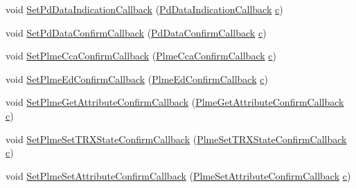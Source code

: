 \begin{DoxyCompactItemize}
\item 
void \hyperlink{classns3_1_1LrWpanPhy_ac008f1b80cac86551aec289676251fa9}{Set\+Pd\+Data\+Indication\+Callback} (\hyperlink{group__lr-wpan_ga5942bd2136b995f9104db9cfc311ace3}{Pd\+Data\+Indication\+Callback} \hyperlink{mmwave_2model_2fading-traces_2fading__trace__generator_8m_ae0323a9039add2978bf5b49550572c7c}{c})
\item 
void \hyperlink{classns3_1_1LrWpanPhy_a04dd58cdf79c6769510d5ea57d8b7326}{Set\+Pd\+Data\+Confirm\+Callback} (\hyperlink{group__lr-wpan_ga0cba923353248fc2a8dc81303c6d5e35}{Pd\+Data\+Confirm\+Callback} \hyperlink{mmwave_2model_2fading-traces_2fading__trace__generator_8m_ae0323a9039add2978bf5b49550572c7c}{c})
\item 
void \hyperlink{classns3_1_1LrWpanPhy_af6bf7c705891030e91c0574a26bc4a0e}{Set\+Plme\+Cca\+Confirm\+Callback} (\hyperlink{group__lr-wpan_gafd859f54b5982ab4c85838a40b1c7340}{Plme\+Cca\+Confirm\+Callback} \hyperlink{mmwave_2model_2fading-traces_2fading__trace__generator_8m_ae0323a9039add2978bf5b49550572c7c}{c})
\item 
void \hyperlink{classns3_1_1LrWpanPhy_a34c4ceaf91ccb56d17dcd92bc392df83}{Set\+Plme\+Ed\+Confirm\+Callback} (\hyperlink{group__lr-wpan_gadecf12d559c4db545036668cf9a384b6}{Plme\+Ed\+Confirm\+Callback} \hyperlink{mmwave_2model_2fading-traces_2fading__trace__generator_8m_ae0323a9039add2978bf5b49550572c7c}{c})
\item 
void \hyperlink{classns3_1_1LrWpanPhy_a17d17169a7e9a9571bc904aae7cf0391}{Set\+Plme\+Get\+Attribute\+Confirm\+Callback} (\hyperlink{group__lr-wpan_ga024ef2b58b799155fc114f3d895ca283}{Plme\+Get\+Attribute\+Confirm\+Callback} \hyperlink{mmwave_2model_2fading-traces_2fading__trace__generator_8m_ae0323a9039add2978bf5b49550572c7c}{c})
\item 
void \hyperlink{classns3_1_1LrWpanPhy_a1f251e13ef1dfd58b5261f9e214f0a8f}{Set\+Plme\+Set\+T\+R\+X\+State\+Confirm\+Callback} (\hyperlink{group__lr-wpan_ga65eacebda6dc7c1611bea032c5a525a7}{Plme\+Set\+T\+R\+X\+State\+Confirm\+Callback} \hyperlink{mmwave_2model_2fading-traces_2fading__trace__generator_8m_ae0323a9039add2978bf5b49550572c7c}{c})
\item 
void \hyperlink{classns3_1_1LrWpanPhy_ad52317c8933455e29710e2ae7ef5d829}{Set\+Plme\+Set\+Attribute\+Confirm\+Callback} (\hyperlink{group__lr-wpan_gab86861c72f1d605df34795c411122e68}{Plme\+Set\+Attribute\+Confirm\+Callback} \hyperlink{mmwave_2model_2fading-traces_2fading__trace__generator_8m_ae0323a9039add2978bf5b49550572c7c}{c})
\item 

\end{DoxyCompactItemize}

